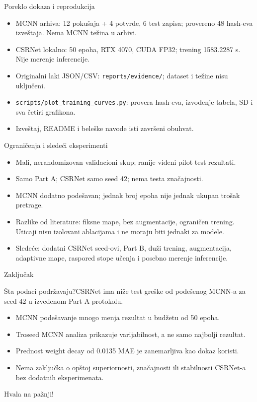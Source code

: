 \documentclass[aspectratio=169]{beamer}
\begin{document}
\begin{frame}{Poreklo dokaza i reprodukcija}
\begin{itemize}
\item MCNN arhiva: 12 pokušaja + 4 potvrde, 6 test zapisa; provereno 48 hash-eva izveštaja. Nema MCNN težina u arhivi.
\item CSRNet lokalno: 50 epoha, RTX 4070, CUDA FP32; trening 1583.2287 s. Nije merenje inferencije.
\item Originalni laki JSON/CSV: \texttt{reports/evidence/}; dataset i težine nisu uključeni.
\item \texttt{scripts/plot\_training\_curves.py}: provera hash-eva, izvođenje tabela, SD i sva četiri grafikona.
\item Izveštaj, README i beleške navode isti završeni obuhvat.
\end{itemize}
\end{frame}

\begin{frame}{Ograničenja i sledeći eksperimenti}
\begin{itemize}
\item Mali, nerandomizovan validacioni skup; ranije viđeni pilot test rezultati.
\item Samo Part A; CSRNet samo seed 42; nema testa značajnosti.
\item MCNN dodatno podešavan; jednak broj epoha nije jednak ukupan trošak pretrage.
\item Razlike od literature: fiksne mape, bez augmentacije, ograničen trening. Uticaji nisu izolovani ablacijama i ne moraju biti jednaki za modele.
\item Sledeće: dodatni CSRNet seed-ovi, Part B, duži trening, augmentacija, adaptivne mape, raspored stope učenja i posebno merenje inferencije.
\end{itemize}
\end{frame}

\begin{frame}{Zaključak}
\begin{block}{Šta podaci podržavaju?}CSRNet ima niže test greške od podešenog MCNN-a za seed 42 u izvedenom Part A protokolu.\end{block}
\begin{itemize}
\item MCNN podešavanje mnogo menja rezultat u budžetu od 50 epoha.
\item Troseed MCNN analiza prikazuje varijabilnost, a ne samo najbolji rezultat.
\item Prednost weight decay od 0.0135 MAE je zanemarljiva kao dokaz koristi.
\item Nema zaključka o opštoj superiornosti, značajnosti ili stabilnosti CSRNet-a bez dodatnih eksperimenata.
\end{itemize}
\centering Hvala na pažnji!
\end{frame}
\end{document}
